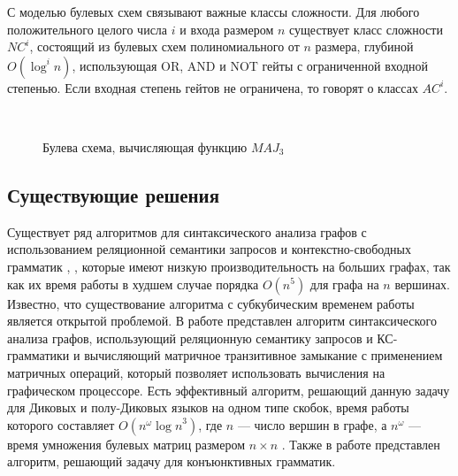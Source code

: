 \documentclass{spbau-diploma}
\begin{document}
С моделью булевых схем связывают важные классы сложности.  Для любого положительного целого числа $i$ и входа размером $n$ существует класс сложности $NC^i$, состоящий из булевых схем полиномиального от $n$ размера, глубиной $O(\log^i n)$, использующая OR, AND и NOT гейты с ограниченной входной степенью. Если входная степень гейтов не ограничена, то говорят о классах $AC^i$.
\begin{figure}

\centering
{}
 \\

	\caption{Булева схема, вычисляющая функцию $MAJ_3$}
\label{circuit}
\end{figure}


\subsection{Существующие решения}
Существует ряд алгоритмов для синтаксического анализа графов с использованием реляционной семантики запросов и контекстно-свободных грамматик \cite{HellingsCFPQ}, \cite{MatrixMult}, которые имеют низкую производительность на больших графах, так как их время работы в худшем случае порядка $O(n^5)$ для графа на $n$ вершинах. Известно, что существование алгоритма с субкубическим временем работы является открытой проблемой. В работе \cite{MatrixMult} представлен алгоритм синтаксического анализа графов, использующий реляционную семантику запросов и КС-грамматики и вычисляющий матричное транзитивное замыкание с применением матричных операций, который позволяет использовать вычисления на графическом процессоре. Есть эффективный алгоритм, решающий данную задачу для Диковых и полу-Диковых языков на одном типе скобок, время работы которого составляет $O(n^{\omega}{\log{n}}^3)$, где $n$ ---  число вершин в графе, а $n^{\omega}$ --- время умножения булевых матриц размером $n \times n$ \cite{Bradford}. Также в работе \cite{ConjPath} представлен алгоритм, решающий задачу для конъюнктивных грамматик.
\end{document}
